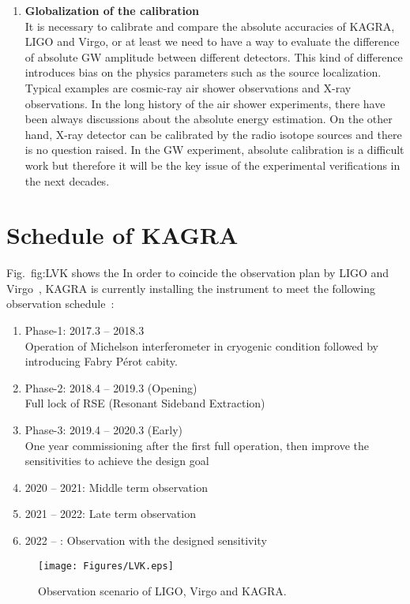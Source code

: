 \begin{enumerate}
\item {\bf Globalization of the calibration}\\
It is necessary to calibrate and compare the absolute accuracies of KAGRA, 
LIGO and Virgo, or at least we need to have a way to evaluate the difference 
of absolute GW amplitude between different detectors. This kind of difference 
introduces bias on the physics parameters such as the source localization. 
Typical examples are cosmic-ray air shower observations and X-ray 
observations. In the long history of the air shower experiments, 
there have been always discussions about the absolute energy estimation. 
On the other hand, X-ray detector can be calibrated by the radio isotope 
sources and there is no question raised. In the GW experiment, absolute 
calibration is a difficult work but therefore it will be the key issue of the 
experimental verifications in the next decades.

\end{enumerate}



\section{Schedule of KAGRA}

Fig.~{fig:LVK} shows the 
In order to coincide the observation plan by LIGO and Virgo~\cite{LV-obs},
KAGRA is currently installing the instrument to meet the following observation
schedule~\cite{KAGRA-obs}:

\begin{enumerate}
\item Phase-1: 2017.3 -- 2018.3\\
      Operation of Michelson interferometer in cryogenic condition 
      followed by introducing Fabry P\'{e}rot cabity.
\item Phase-2: 2018.4 -- 2019.3 (Opening)\\
      Full lock of RSE (Resonant Sideband Extraction)
\item Phase-3: 2019.4 -- 2020.3 (Early) \\
      One year commissioning after the first full operation, 
      then improve the sensitivities to achieve the design goal
\item 2020 -- 2021: Middle term observation
\item 2021 -- 2022: Late term observation
\item 2022 -- : Observation with the designed sensitivity


\end{enumerate}
\begin{figure}
\begin{center}
\texttt{[image: Figures/LVK.eps]}
\caption{Observation scenario of LIGO, Virgo and KAGRA.} 
\label{fig:LVK} 
\end{center}
\end{figure}


